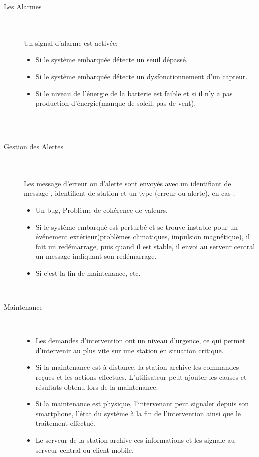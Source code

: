 \begin{description}
\item [Les Alarmes]\hfill\\
	\\ Un signal d'alarme est activée:\\
	\begin{itemize}
		\item Si le système embarquée détecte un seuil dépassé.\\
		\item Si le système embarquée détecte un dysfonctionnement d'un capteur.\\
		\item Si le niveau de l'énergie de la batterie est faible et si il n'y a pas production d'énergie(manque de soleil, pas de vent).\\
	\end{itemize}\\
\hfill\\
\item [Gestion des Alertes]\hfill\\
	\\ Les message d'erreur ou d'alerte sont envoyés avec un identifiant de message , identifient de station et un type (erreur ou alerte), en cas  :\\
		\begin{itemize}
		\item Un bug, Problème de cohérence de valeurs.\\
		\item Si le système embarqué est perturbé et se trouve instable pour un événement extérieur(problèmes climatiques, impulsion magnétique), il fait un redémarrage, puis quand il est stable, il envoi au serveur central un message indiquant son redémarrage.  \\
		\item Si c'est la fin de maintenance, etc.
	\end{itemize}
\hfill\\
\item [Maintenance]\hfill\\
	\begin{itemize}
	\item Les demandes d'intervention ont un niveau d'urgence, ce qui permet d'intervenir au plus vite sur une station en situation critique.\\
	\item Si la maintenance est à distance, la station archive les commandes reçues et les actions effectues. L'utilisateur peut ajouter les causes et résultats obtenu lors de la maintenance.\\
	\item Si la maintenance est physique, l'intervenant peut signaler depuis son smartphone, l'état du système à la fin de l'intervention ainsi que le traitement effectué. \\
	\item Le serveur de la station archive ces informations et les signale au serveur central ou client mobile.\\
	\end{itemize}

\end{description}	

